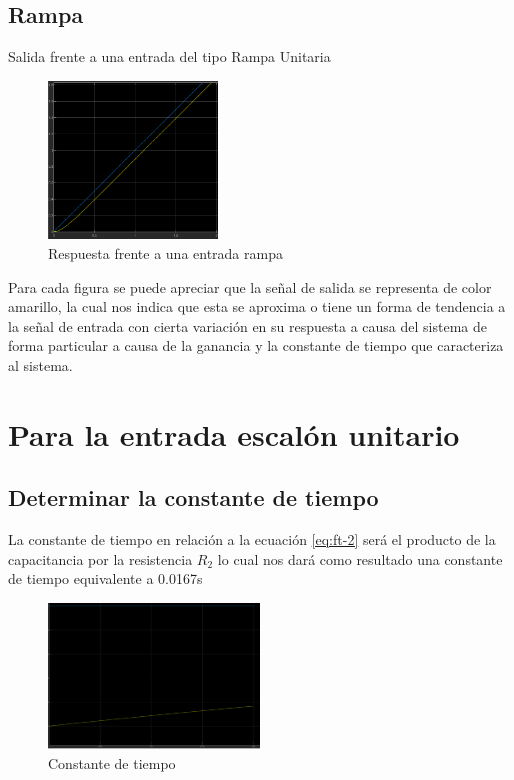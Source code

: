 \documentclass[conference]{IEEEtran}
\begin{document}
	\subsection{Rampa}
	Salida frente a una entrada del tipo Rampa Unitaria
	\begin{figure}[h]
		\centering
		\includegraphics[width=0.4\textwidth]{../INFORME PREVIO/media/rampa}
		\caption{Respuesta frente a una entrada rampa}
		\label{fig:rampa}
	\end{figure}
	
	Para cada figura se puede apreciar que la señal de salida se representa de color amarillo, la cual nos indica que esta se aproxima o tiene un forma de tendencia a la señal de entrada con cierta variación en su respuesta a causa del sistema de forma particular a causa de la ganancia y la constante de tiempo que caracteriza al sistema.
	
	\section{Para la entrada escalón unitario}
	\subsection{Determinar la constante de tiempo}
	La constante de tiempo en relación a la ecuación \ref{eq:ft-2} será el producto de la capacitancia por la resistencia $R_2$ lo cual nos dará como resultado una constante de tiempo equivalente a 0.0167s
	
	\begin{figure}[h]
		\centering
		\includegraphics[width=0.5\textwidth]{../INFORME PREVIO/media/tau-escalon}
		\caption{Constante de tiempo}
		\label{fig:tau-escalon}
	\end{figure}
	
\end{document}
